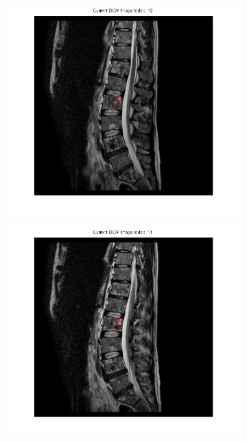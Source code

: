\documentclass{article}
\begin{document}
{\begin{figure}[h]
      \begin{subfigure}[t]{0.15\linewidth}
        \centering
        \includegraphics[width=\linewidth,trim={6cm 3cm 6cm 0},clip]{imgs/mask10}
      \end{subfigure}
      \hfill
      \begin{subfigure}[t]{0.15\linewidth}
        \centering
        \includegraphics[width=\linewidth,trim={6cm 3cm 6cm 0},clip]{imgs/mask11}

\end{subfigure}
\end{figure}}
\end{document}
